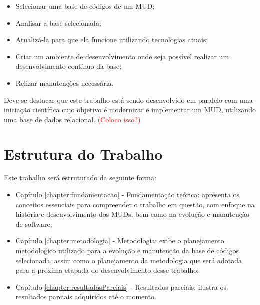 \begin{itemize}
    \item Selecionar uma base de códigos de um MUD;
    \item Analisar a base selecionada;
    \item Atualizá-la para que ela funcione utilizando tecnologias atuais;
    \item Criar um ambiente de desenvolvimento onde seja possível realizar um desenvolvimento contínuo da base;
    \item Relizar manutenções necessária.
\end{itemize}

Deve-se destacar que este trabalho está sendo desenvolvido em paralelo com uma iniciação científica cujo 
objetivo é modernizar e implementar um MUD, utilizando uma base de dados relacional. \textcolor{red}{(Coloco isso?)}

\section{Estrutura do Trabalho}

Este trabalho será estruturado da seguinte forma:

\begin{itemize}
    \item Capítulo \ref{chapter:fundamentacao} - Fundamentação teórica: apresenta os conceitos essenciais 
    para compreender o trabalho em questão, com enfoque na história e desenvolvimento dos MUDs, bem como 
    na evolução e manutenção de software;
    \item Capítulo \ref{chapter:metodologia} - Metodologia: exibe o planejamento metodologico utilizado para 
    a evolução e manutenção da base de códigos selecionada, assim como o planejamento da metodologia que 
    será adotada para a próxima etapada do desenvolvimento desse trabalho;
    \item Capítulo \ref{chapter:resultadosParciais} - Resultados parciais: ilustra os resultados parciais 
    adquiridos até o momento.
\end{itemize}